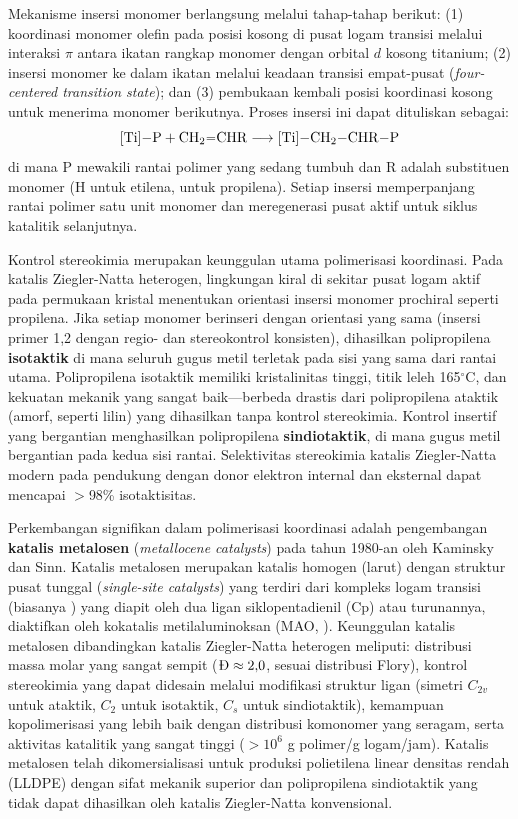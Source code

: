 \documentclass[12pt,a4paper,openany]{book}
\begin{document}
Mekanisme insersi monomer berlangsung melalui tahap-tahap berikut: (1) koordinasi monomer olefin pada posisi kosong di pusat logam transisi melalui interaksi $\pi$ antara ikatan rangkap  monomer dengan orbital $d$ kosong titanium; (2) insersi monomer ke dalam ikatan  melalui keadaan transisi empat-pusat (\textit{four-centered transition state}); dan (3) pembukaan kembali posisi koordinasi kosong untuk menerima monomer berikutnya. Proses insersi ini dapat dituliskan sebagai:
\begin{equation}
  \ce{[Ti]-P} + \ce{CH2=CHR} \longrightarrow \ce{[Ti]-CH2-CHR-P}
\end{equation}
di mana P mewakili rantai polimer yang sedang tumbuh dan R adalah substituen monomer (H untuk etilena,  untuk propilena). Setiap insersi memperpanjang rantai polimer satu unit monomer dan meregenerasi pusat aktif untuk siklus katalitik selanjutnya.

Kontrol stereokimia merupakan keunggulan utama polimerisasi koordinasi. Pada katalis Ziegler-Natta heterogen, lingkungan kiral di sekitar pusat logam aktif pada permukaan kristal menentukan orientasi insersi monomer prochiral seperti propilena. Jika setiap monomer berinseri dengan orientasi yang sama (insersi primer 1,2 dengan regio- dan stereokontrol konsisten), dihasilkan polipropilena \textbf{isotaktik} di mana seluruh gugus metil terletak pada sisi yang sama dari rantai utama. Polipropilena isotaktik memiliki kristalinitas tinggi, titik leleh 165$^\circ$C, dan kekuatan mekanik yang sangat baik---berbeda drastis dari polipropilena ataktik (amorf, seperti lilin) yang dihasilkan tanpa kontrol stereokimia. Kontrol insertif yang bergantian menghasilkan polipropilena \textbf{sindiotaktik}, di mana gugus metil bergantian pada kedua sisi rantai. Selektivitas stereokimia katalis Ziegler-Natta modern pada pendukung  dengan donor elektron internal dan eksternal dapat mencapai $>$98\% isotaktisitas.

Perkembangan signifikan dalam polimerisasi koordinasi adalah pengembangan \textbf{katalis metalosen} (\textit{metallocene catalysts}) pada tahun 1980-an oleh Kaminsky dan Sinn. Katalis metalosen merupakan katalis homogen (larut) dengan struktur pusat tunggal (\textit{single-site catalysts}) yang terdiri dari kompleks logam transisi (biasanya ) yang diapit oleh dua ligan siklopentadienil (Cp) atau turunannya, diaktifkan oleh kokatalis metilaluminoksan (MAO, ). Keunggulan katalis metalosen dibandingkan katalis Ziegler-Natta heterogen meliputi: distribusi massa molar yang sangat sempit ($\text{\DH} \approx 2{,}0$, sesuai distribusi Flory), kontrol stereokimia yang dapat didesain melalui modifikasi struktur ligan (simetri $C_{2v}$ untuk ataktik, $C_2$ untuk isotaktik, $C_s$ untuk sindiotaktik), kemampuan kopolimerisasi yang lebih baik dengan distribusi komonomer yang seragam, serta aktivitas katalitik yang sangat tinggi ($>10^6$ g polimer/g logam/jam). Katalis metalosen telah dikomersialisasi untuk produksi polietilena linear densitas rendah (LLDPE) dengan sifat mekanik superior dan polipropilena sindiotaktik yang tidak dapat dihasilkan oleh katalis Ziegler-Natta konvensional.
\end{document}
